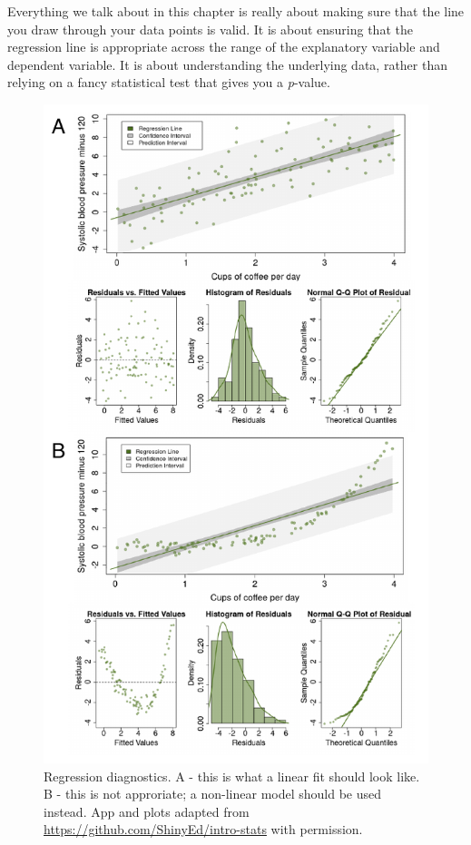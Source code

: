 \documentclass[
  12pt,
  krantz2]{krantz}
\begin{document}
Everything we talk about in this chapter is really about making sure that the line you draw through your data points is valid.
It is about ensuring that the regression line is appropriate across the range of the explanatory variable and dependent variable.
It is about understanding the underlying data, rather than relying on a fancy statistical test that gives you a \emph{p}-value.

\begin{figure}
\centering
\includegraphics{images/chapter07/3_diags.pdf}
\caption{\label{fig:chap07-fig-diags}Regression diagnostics. A - this is what a linear fit should look like. B - this is not approriate; a non-linear model should be used instead. App and plots adapted from \url{https://github.com/ShinyEd/intro-stats} with permission.}
\end{figure}
\end{document}
